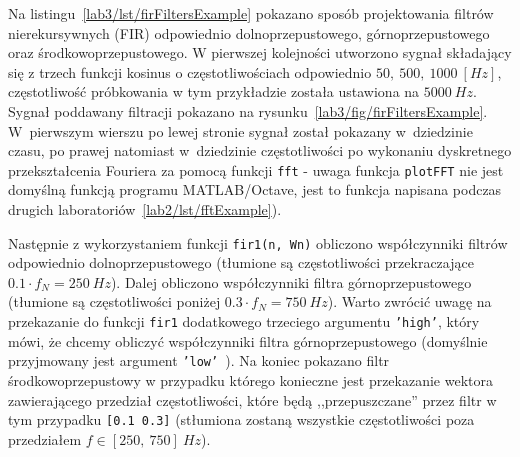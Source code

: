 Na listingu~\ref{lab3/lst/firFiltersExample} pokazano sposób projektowania filtrów nierekursywnych (FIR) odpowiednio dolnoprzepustowego, górnoprzepustowego oraz środkowoprzepustowego. W pierwszej kolejności utworzono sygnał składający się z trzech funkcji kosinus o częstotliwościach odpowiednio $50,~500,~1000~[Hz]$, częstotliwość próbkowania w tym przykładzie została ustawiona na $5000~Hz$. Sygnał poddawany filtracji pokazano na rysunku~\ref{lab3/fig/firFiltersExample}. W~pierwszym wierszu po lewej stronie sygnał został pokazany w~dziedzinie czasu, po prawej natomiast w~dziedzinie częstotliwości po wykonaniu dyskretnego przekształcenia Fouriera za pomocą funkcji \texttt{fft} - uwaga funkcja \texttt{plotFFT} nie jest domyślną funkcją programu MATLAB/Octave, jest to funkcja napisana podczas drugich laboratoriów~\ref{lab2/lst/fftExample}).

Następnie z wykorzystaniem funkcji \texttt{fir1(n, Wn)} obliczono współczynniki filtrów odpowiednio dolnoprzepustowego (tłumione są częstotliwości przekraczające $0.1\cdot f_N = 250~Hz$). Dalej obliczono współczynniki filtra górnoprzepustowego (tłumione są częstotliwości poniżej $0.3\cdot f_N = 750~Hz$). Warto zwrócić uwagę na przekazanie do funkcji \texttt{fir1} dodatkowego trzeciego argumentu \texttt{'high'}, który mówi, że chcemy obliczyć współczynniki filtra górnoprzepustowego (domyślnie przyjmowany jest argument \texttt{'low' }). Na koniec pokazano filtr środkowoprzepustowy w przypadku którego konieczne jest przekazanie wektora zawierającego przedział częstotliwości, które będą ,,przepuszczane'' przez filtr w tym przypadku \texttt{[0.1 0.3]} (stłumiona zostaną wszystkie częstotliwości poza przedziałem $f \in [250,~750]~Hz$).




